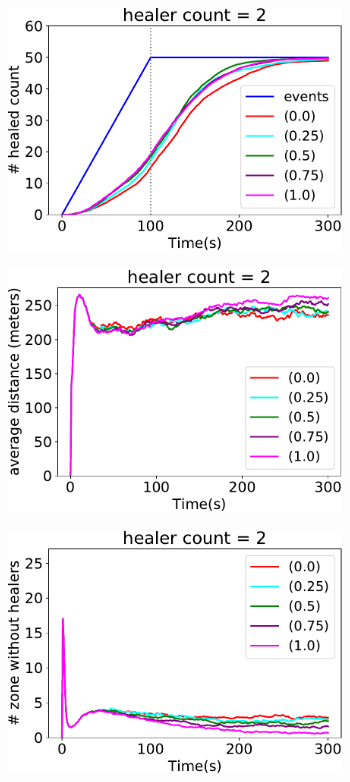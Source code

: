 \documentclass[jsan,article,accept,moreauthors,pdftex]{Definitions/mdpi}
\begin{document}
\begin{figure}[H]
\widefigure
\begin{subfigure}[b]{0.32\textwidth}
\centering
\includegraphics[width=0.97\textwidth]{imgs/healed-2.pdf}
\end{subfigure}
\hfill
%
\begin{subfigure}[b]{0.32\textwidth}
\centering
\includegraphics[width=0.97\textwidth]{imgs/avg-distance-from-leader-2.pdf}
\end{subfigure}
\hfill
%
\begin{subfigure}[b]{0.32\textwidth}
\centering
\includegraphics[width=0.97\textwidth]{imgs/empty-zone-2.pdf}

\end{subfigure}
\end{figure}
\end{document}
